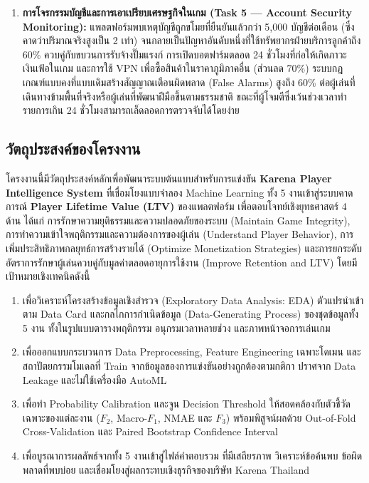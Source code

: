 \documentclass[11pt,a4paper]{article}
\DeclareRobustCommand{\code}[1]{\leavevmode{\ttfamily\color{KeyGreen!85!black}\let\codeunderscore\_\def\_{\codeunderscore\allowbreak}\hyphenpenalty=50\exhyphenpenalty=50\relax#1}}
\begin{document}
\begin{enumerate}[leftmargin=1.9em,itemsep=2.5pt]
    \item \textbf{การโจรกรรมบัญชีและการเอาเปรียบเศรษฐกิจในเกม (Task 5 — Account Security Monitoring):} แพลตฟอร์มพบเหตุบัญชีถูกขโมยที่ยืนยันแล้วกว่า 5,000 บัญชีต่อเดือน (ซึ่งคาดว่าปริมาณจริงสูงเป็น 2 เท่า) จนกลายเป็นปัญหาอันดับหนึ่งที่ใช้ทรัพยากรฝ่ายบริการลูกค้าถึง 60\% ควบคู่กับขบวนการรับจ้างปั๊มแรงก์ การเปิดบอตฟาร์มตลอด 24 ชั่วโมงที่ก่อให้เกิดภาวะเงินเฟ้อในเกม และการใช้ VPN เพื่อซื้อสินค้าในราคาภูมิภาคอื่น (ส่วนลด 70\%) ระบบกฎเกณฑ์แบบคงที่แบบเดิมสร้างสัญญาณเตือนผิดพลาด (False Alarms) สูงถึง 60\% ต่อผู้เล่นที่เดินทางข้ามพื้นที่จริงหรือผู้เล่นที่พัฒนาฝีมือขึ้นตามธรรมชาติ ขณะที่ผู้โจมตีซึ่งเว้นช่วงเวลาทำรายการเกิน 24 ชั่วโมงสามารถเล็ดลอดการตรวจจับได้โดยง่าย
\end{enumerate}

\subsection{วัตถุประสงค์ของโครงงาน}

โครงงานนี้มีวัตถุประสงค์หลักเพื่อพัฒนาระบบต้นแบบสำหรับการแข่งขัน \textbf{Karena Player Intelligence System} ที่เชื่อมโยงแบบจำลอง Machine Learning ทั้ง 5 งานเข้าสู่ระบบคาดการณ์ \textbf{Player Lifetime Value (LTV)} ของแพลตฟอร์ม เพื่อตอบโจทย์เชิงยุทธศาสตร์ 4 ด้าน ได้แก่ การรักษาความยุติธรรมและความปลอดภัยของระบบ (Maintain Game Integrity), การทำความเข้าใจพฤติกรรมและความต้องการของผู้เล่น (Understand Player Behavior), การเพิ่มประสิทธิภาพกลยุทธ์การสร้างรายได้ (Optimize Monetization Strategies) และการยกระดับอัตราการรักษาผู้เล่นควบคู่กับมูลค่าตลอดอายุการใช้งาน (Improve Retention and LTV) โดยมีเป้าหมายเชิงเทคนิคดังนี้

\begin{enumerate}[leftmargin=1.8em,itemsep=2pt]
    \item เพื่อวิเคราะห์โครงสร้างข้อมูลเชิงสำรวจ (Exploratory Data Analysis: EDA) ตัวแปรนำเข้าตาม Data Card และกลไกการกำเนิดข้อมูล (Data-Generating Process) ของชุดข้อมูลทั้ง 5 งาน ทั้งในรูปแบบตารางพฤติกรรม อนุกรมเวลาหลายช่วง และภาพหน้าจอการเล่นเกม
    \item เพื่อออกแบบกระบวนการ Data Preprocessing, Feature Engineering เฉพาะโดเมน และสถาปัตยกรรมโมเดลที่ Train จากข้อมูลของการแข่งขันอย่างถูกต้องตามกติกา ปราศจาก Data Leakage และไม่ใช้เครื่องมือ AutoML
    \item เพื่อทำ Probability Calibration และจูน Decision Threshold ให้สอดคล้องกับตัวชี้วัดเฉพาะของแต่ละงาน ($F_2$, Macro-$F_1$, NMAE และ $F_3$) พร้อมพิสูจน์ผลด้วย Out-of-Fold Cross-Validation และ Paired Bootstrap Confidence Interval
    \item เพื่อบูรณาการผลลัพธ์จากทั้ง 5 งานเข้าสู่ไฟล์คำตอบรวม \code{submission.csv} ที่มีเสถียรภาพ วิเคราะห์ข้อค้นพบ ข้อผิดพลาดที่พบบ่อย และเชื่อมโยงสู่ผลกระทบเชิงธุรกิจของบริษัท Karena Thailand
\end{enumerate}
\end{document}
